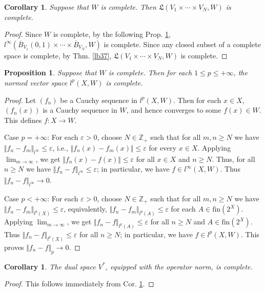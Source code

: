 \documentclass[12pt,b5paper,notitlepage]{article}
\theoremstyle{definition}
\theoremstyle{plain}
\newtheorem{pp}[df]{Proposition}
\newtheorem{co}[df]{Corollary}
\newcommand{\fk}{\mathfrak}
\newcommand{\ovl}{\overline}
\newcommand{\Zbb}{\mathbb Z}
\newcommand{\fin}{\mathrm{fin}}
\newcommand{\eps}{\varepsilon}
\numberwithin{equation}{section}
\begin{document}
\begin{co}\label{lb39}
Suppose that $W$ is complete. Then $\fk L(V_1\times\cdots\times V_N,W)$ is complete.
\end{co}

\begin{proof}
Since $W$ is complete, by the following Prop. \ref{lb38}, $l^\infty(\ovl B_{V_1}(0,1)\times\cdots\times\ovl B_{V_N},W)$ is complete. Since any closed subset of a complete space is complete, by Thm. \ref{lb37}, $\fk L(V_1\times\cdots\times V_N,W)$ is complete.
\end{proof}



\begin{pp}\label{lb38}
Suppose that $W$ is complete. Then for each $1\leq p\leq+\infty$, the normed vector space $l^p(X,W)$ is complete.
\end{pp}

\begin{proof}
Let $(f_n)$ be a Cauchy sequence in $l^p(X,W)$. Then for each $x\in X$, $(f_n(x))$ is a Cauchy sequence in $W$, and hence converges to some $f(x)\in W$. This defines $f:X\rightarrow W$. 

Case $p=+\infty$: For each $\eps>0$, choose $N\in\Zbb_+$ such that for all $m,n\geq N$ we have $\Vert f_n-f_m\Vert_{l^\infty}\leq\eps$, i.e.,  $\Vert f_n(x)-f_m(x)\Vert\leq\eps$ for every $x\in X$.  Applying $\lim_{m\rightarrow\infty}$, we get $\Vert f_n(x)-f(x)\Vert\leq\eps$ for all $x\in X$ and $n\geq N$. Thus, for all $n\geq N$ we have $\Vert f_n-f\Vert_{l^\infty}\leq \eps$; in particular, we have $f\in l^\infty(X,W)$. Thus $\Vert f_n-f\Vert_{l^\infty}\rightarrow0$.

Case $p<+\infty$: For each $\eps>0$, choose $N\in\Zbb_+$ such that for all $m,n\geq N$ we have $\Vert f_n-f_m\Vert_{l^p(X)}\leq\eps$, equivalently, $\Vert f_n-f_m\Vert_{l^p(A)}\leq\eps$ for each $A\in\fin(2^X)$. Applying $\lim_{m\rightarrow\infty}$, we get $\Vert f_n-f\Vert_{l^p(A)}\leq\eps$ for all $n\geq N$ and $A\in\fin(2^X)$. Thus $\Vert f_n-f\Vert_{l^p(X)}\leq\eps$ for all $n\geq N$; in particular, we have $f\in l^p(X,W)$. This proves $\Vert f_n-f\Vert_p\rightarrow0$.
\end{proof}


\begin{co}\label{lb128}
The dual space $V^*$, equipped with the operator norm, is complete.
\end{co}


\begin{proof}
This follows immediately from Cor. \ref{lb39}.
\end{proof}
\end{document}
